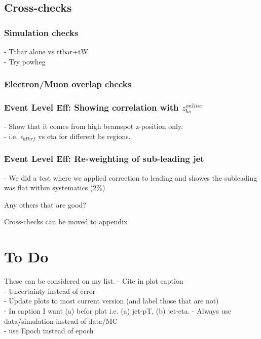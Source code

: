 \FloatBarrier
\newpage

\subsection{Cross-checks}
\subsubsection{Simulation checks}
- Ttbar alone vs ttbar+tW\\
- Try powheg
\subsubsection{Electron/Muon overlap checks}
\subsubsection{Event Level Eff: Showing correlation with $z_{bs}^{online}$}
- Show that it comes from high beamspot z-position only.\\
- i.e. $\epsilon_{bPerf}$ vs eta for different bs regions.
\subsubsection{Event Level Eff: Re-weighting of sub-leading jet}
- We did a test where we applied correction to leading and showes the subleading was flat within systematics (2\%)

Any others that are good?

Cross-checks can be moved to appendix

\section{To Do}

These can be considered on my list.
\noindent
- Cite in plot caption\\
- Uncertainty instead of error\\
- Update plots to most current version (and label those that are not)\\
- In caption I want (a) befor plot i.e. (a) jet-pT, (b) jet-eta.
- Always use data/simulation instead of data/MC\\
- use Epoch instead of epoch\\
